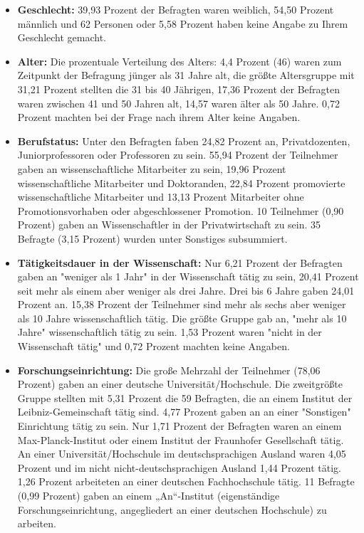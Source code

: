 \begin{itemize}
\item \textbf{Geschlecht:} 39,93 Prozent der Befragten waren weiblich, 54,50 Prozent männlich und 62 Personen oder 5,58 Prozent haben keine Angabe zu Ihrem Geschlecht gemacht.
\item \textbf{Alter:} Die prozentuale Verteilung des Alters: 4,4 Prozent (46) waren zum Zeitpunkt der Befragung jünger als 31 Jahre alt, die größte Altersgruppe mit 31,21 Prozent stellten die 31 bis 40 Jährigen, 17,36 Prozent der Befragten waren zwischen 41 und 50 Jahren alt, 14,57 waren älter als 50 Jahre. 0,72 Prozent machten bei der Frage nach ihrem Alter keine Angaben.
\item \textbf{Berufstatus:} Unter den Befragten faben 24,82 Prozent an, Privatdozenten, Juniorprofessoren oder Professoren zu sein. 55,94 Prozent der Teilnehmer gaben an wissenschaftliche Mitarbeiter zu sein, 19,96 Prozent wissenschaftliche Mitarbeiter und Doktoranden, 22,84 Prozent promovierte wissenschaftliche Mitarbeiter und 13,13 Prozent Mitarbeiter ohne Promotionsvorhaben oder abgeschlossener Promotion. 10 Teilnehmer (0,90 Prozent) gaben an Wissenschaftler in der Privatwirtschaft zu sein. 35 Befragte (3,15 Prozent) wurden unter Sonstiges subsummiert.
\item \textbf{Tätigkeitsdauer in der Wissenschaft:} Nur 6,21 Prozent der Befragten gaben an "weniger als 1 Jahr" in der Wissenschaft tätig zu sein, 20,41 Prozent seit mehr als einem aber weniger als drei Jahre. Drei bis 6 Jahre gaben 24,01 Prozent an. 15,38 Prozent der Teilnehmer sind mehr als sechs aber weniger als 10 Jahre wissenschaftlich tätig. Die größte Gruppe gab an, "mehr als 10 Jahre" wissenschaftlich tätig zu sein. 1,53 Prozent waren "nicht in der Wissenschaft tätig" und 0,72 Prozent machten keine Angaben.
\item \textbf{Forschungseinrichtung:} Die große Mehrzahl der Teilnehmer (78,06 Prozent) gaben an einer deutsche Universität/Hochschule. Die zweitgrößte Gruppe stellten mit 5,31 Prozent die 59 Befragten, die an einem Institut der Leibniz-Gemeinschaft tätig sind. 4,77 Prozent gaben an an einer "Sonstigen" Einrichtung tätig zu sein. Nur 1,71 Prozent der Befragten waren an einem Max-Planck-Institut oder einem Institut der Fraunhofer Gesellschaft tätig. An einer Universität/Hochschule im deutschsprachigen Ausland waren 4,05 Prozent und im nicht nicht-deutschsprachigen Ausland 1,44 Prozent tätig. 1,26 Prozent arbeiteten an einer deutschen Fachhochschule tätig. 11 Befragte (0,99 Prozent) gaben an einem „An“-Institut (eigenständige Forschungseinrichtung, angegliedert an einer deutschen Hochschule) zu arbeiten.
\end{itemize}

